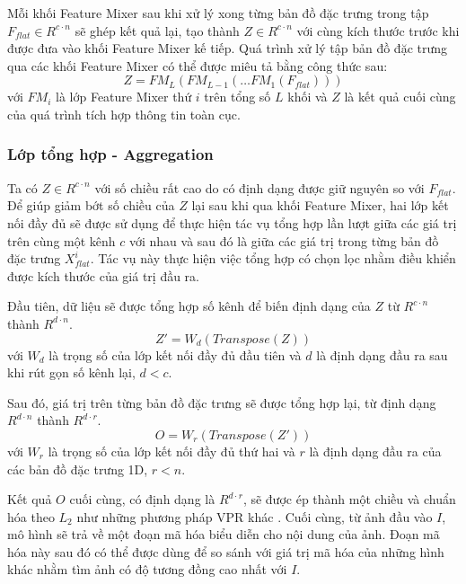 Mỗi khối Feature Mixer sau khi xử lý xong từng bản đồ đặc trưng trong tập $F_{flat} \in R^{c \cdot n}$ sẽ ghép kết quả lại, tạo thành $Z \in R^{c \cdot n}$ với cùng kích thước trước khi được đưa vào khối Feature Mixer kế tiếp. Quá trình xử lý tập bản đồ đặc trưng qua các khối Feature Mixer có thể được miêu tả bằng công thức sau:
\begin{equation}
  Z = FM_L(FM_{L-1}(\dots FM_1(F_{flat})))
\end{equation}
với $FM_i$ là lớp Feature Mixer thứ $i$ trên tổng số $L$ khối và $Z$ là kết quả cuối cùng của quá trình tích hợp thông tin toàn cục.

\subsubsection{Lớp tổng hợp - Aggregation}
Ta có $Z \in R^{c \cdot n}$ với số chiều rất cao do có định dạng được giữ nguyên so với $F_{flat}$. Để giúp giảm bớt số chiều của $Z$ lại sau khi qua khối Feature Mixer, hai lớp kết nối đầy đủ sẽ được sử dụng để thực hiện tác vụ tổng hợp lần lượt giữa các giá trị trên cùng một kênh $c$ với nhau và sau đó là giữa các giá trị trong từng bản đồ đặc trưng $X_{flat}^i$. Tác vụ này thực hiện việc tổng hợp có chọn lọc nhằm điều khiển được kích thước của giá trị đầu ra.

Đầu tiên, dữ liệu sẽ được tổng hợp số kênh để biến định dạng của $Z$ từ $R^{c \cdot n}$ thành $R^{d \cdot n}$.
\begin{equation}
  Z' = W_d(Transpose(Z))
\end{equation}
với $W_d$ là trọng số của lớp kết nối đầy đủ đầu tiên và $d$ là định dạng đầu ra sau khi rút gọn số kênh lại, $d<c$.

Sau đó, giá trị trên từng bản đồ đặc trưng sẽ được tổng hợp lại, từ định dạng $R^{d \cdot n}$ thành $R^{d \cdot r}$.
\begin{equation}
  O = W_r(Transpose(Z'))
\end{equation}
với $W_r$ là trọng số của lớp kết nối đầy đủ thứ hai và $r$ là định dạng đầu ra của các bản đồ đặc trưng 1D, $r<n$.

Kết quả $O$ cuối cùng, có định dạng là $R^{d \cdot r}$, sẽ được ép thành một chiều và chuẩn hóa theo $L_2$ như những phương pháp VPR khác \cite{arandjelovic2016netvlad,berton2022rethinking}. Cuối cùng, từ ảnh đầu vào $I$, mô hình sẽ trả về một đoạn mã hóa biểu diễn cho nội dung của ảnh. Đoạn mã hóa này sau đó có thể được dùng để so sánh với giá trị mã hóa của những hình khác nhằm tìm ảnh có độ tương đồng cao nhất với $I$.

